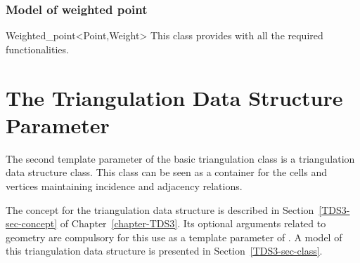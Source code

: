 \ccCreation
{}


\ccAccessFunctions
{}

		\subsubsection{Model of weighted point} 

		\begin{ccClassTemplate}{Weighted_point<Point,Weight>}
This class provides 
with all the required functionalities.



		\end{ccClassTemplate}

\section{The Triangulation Data Structure Parameter}
\label{Triangulation3-sec-tds}

The second template parameter of the basic triangulation class
 is a triangulation data structure
class.  This class can be seen as a container for the cells and
vertices maintaining incidence and adjacency relations. 

The concept for the triangulation data structure is described in
Section~\ref{TDS3-sec-concept} of Chapter~\ref{chapter-TDS3}. Its optional 
arguments related to geometry are compulsory for this use as a
template parameter of .
A model of this triangulation data structure is
 presented in
Section~\ref{TDS3-sec-class}. 
